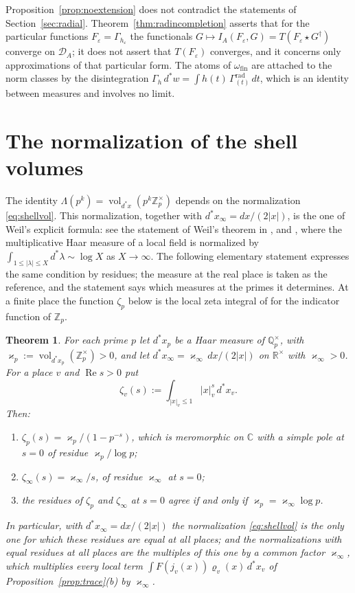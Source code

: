 \documentclass[11pt]{amsart}
\newtheorem{theorem}{Theorem}[section]
\theoremstyle{definition}
\newcommand{\C}{\mathbb C}
\newcommand{\R}{\mathbb R}
\newcommand{\Z}{\mathbb Z}
\newcommand{\Q}{\mathbb Q}
\newcommand{\Rel}{\operatorname{Re}}
\newcommand{\vol}{\operatorname{vol}}
\newcommand{\DA}{\mathcal D_A}
\begin{document}
Proposition~\ref{prop:noextension} does not contradict the statements of
Section~\ref{sec:radial}. Theorem~\ref{thm:radincompletion} asserts that for
the particular functions $F_\varepsilon=\Gamma_{h_\varepsilon}$ the
functionals $G\mapsto I_A(F_\varepsilon,G)=T(F_\varepsilon\star G^\dagger)$
converge on $\DA$; it does not assert that $T(F_\varepsilon)$ converges, and
it concerns only approximations of that particular form. The atoms of
$\omega_{\mathrm{fin}}$ are attached to the norm classes by the
disintegration $\Gamma_h\,d^*w=\int h(t)\,\Gamma^{\mathrm{rad}}_{(t)}\,dt$,
which is an identity between measures and involves no limit.

\appendix

\section{The normalization of the shell volumes}
\label{sec:normalization}

The identity $\Lambda(p^k)=\vol_{d^*x}(p^k\Z_p^\times)$ depends on the
normalization \eqref{eq:shellvol}. This normalization, together with
$d^*x_\infty=dx/(2|x|)$, is the one of Weil's explicit formula: see the
statement of Weil's theorem in \cite{BurnolSimple}, and
\cite[Section~V, (14)]{Connes99}, where the multiplicative Haar measure of a
local field is normalized by
$\int_{1\le|\lambda|\le X}d^*\lambda\sim\log X$ as
$X\to\infty$. The following elementary statement expresses the same
condition by residues; the measure at the real place is taken as the
reference, and the statement says which measures at the primes it
determines. At a finite place the function $\zeta_p$ below is the local zeta
integral of \cite{Tate} for the indicator function of $\Z_p$.

\begin{theorem}\label{thm:tateresidue}
For each prime $p$ let $d^*x_p$ be a Haar measure of $\Q_p^\times$, with
$\varkappa_p:=\vol_{d^*x_p}(\Z_p^\times)>0$, and let
$d^*x_\infty=\varkappa_\infty\,dx/(2|x|)$ on $\R^\times$ with
$\varkappa_\infty>0$. For a place $v$ and $\Rel s>0$ put
\[
  \zeta_v(s):=\int_{|x|_v\le1}|x|_v^s\,d^*x_v .
\]
Then:
\begin{enumerate}
\item[(i)] $\zeta_p(s)=\varkappa_p/(1-p^{-s})$, which is meromorphic on $\C$
with a simple pole at $s=0$ of residue $\varkappa_p/\log p$;
\item[(ii)] $\zeta_\infty(s)=\varkappa_\infty/s$, of residue
$\varkappa_\infty$ at $s=0$;
\item[(iii)] the residues of $\zeta_p$ and $\zeta_\infty$ at $s=0$ agree if
and only if $\varkappa_p=\varkappa_\infty\log p$.
\end{enumerate}
In particular, with $d^*x_\infty=dx/(2|x|)$ the normalization
\eqref{eq:shellvol} is the only one for which these residues are equal at
all places; and the normalizations with equal residues at all places are the
multiples of this one by a common factor $\varkappa_\infty$, which multiplies
every local term $\int F(j_v(x))\varrho_v(x)\,d^*x_v$ of
Proposition~\ref{prop:trace}(b) by $\varkappa_\infty$.
\end{theorem}
\end{document}
